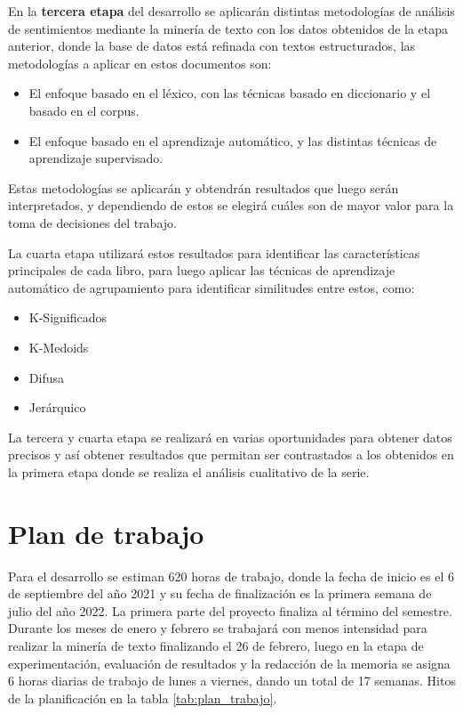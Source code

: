 En la \textbf{tercera etapa} del desarrollo se aplicarán distintas metodologías de análisis de sentimientos mediante la minería de texto con los datos obtenidos de la etapa anterior, donde la base de datos está refinada con textos estructurados, las metodologías a aplicar en estos documentos son:
\begin{itemize}
    \item El enfoque basado en el léxico, con las técnicas basado en diccionario y el basado en el corpus.
    \item El enfoque basado en el aprendizaje automático, y las distintas técnicas de aprendizaje supervisado.
\end{itemize}
Estas metodologías se aplicarán y obtendrán resultados que luego serán interpretados, y dependiendo de estos se elegirá cuáles son de mayor valor para la toma de decisiones del trabajo.

La cuarta etapa utilizará estos resultados para identificar las características principales de cada libro, para luego aplicar las técnicas de aprendizaje automático de agrupamiento para identificar similitudes entre estos, como:
\begin{itemize}
    \item K-Significados
    \item K-Medoids
    \item Difusa
    \item Jerárquico
\end{itemize}

La tercera y cuarta etapa se realizará en varias oportunidades para obtener datos precisos y así obtener resultados que permitan ser contrastados a los obtenidos en la primera etapa donde se realiza el análisis cualitativo de la serie. 



    
\chapter{Plan de trabajo}


Para el desarrollo se estiman 620 horas de trabajo, donde la fecha de inicio es el 6 de septiembre del año 2021 y su fecha de finalización es la primera semana de julio del año 2022. La primera parte del proyecto finaliza al término del semestre. Durante los meses de enero y febrero se trabajará con menos intensidad para realizar la minería de texto finalizando el 26 de febrero, luego  en la etapa de experimentación, evaluación de resultados y la redacción de la memoria se asigna 6 horas diarias de trabajo de lunes a viernes, dando un total de 17 semanas. Hitos de la planificación en la tabla \ref{tab:plan_trabajo}.

